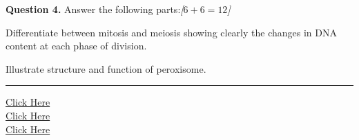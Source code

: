\documentclass[11pt,a4paper]{article}
\newcommand{\pts}[1]{\hfill   \textit{[#1]}}
\begin{document}
\medskip


\noindent   \textbf{Question 4.} Answer the following parts:\pts{$6 + 6 = 12$}

\begin{parts}
  \item Differentiate between mitosis and meiosis showing clearly the changes in DNA content at each phase of division.
  \item Illustrate structure and function of peroxisome.
\end{parts}

\vfill
\rule{\linewidth}{0.4pt}

\begin{center}\small
\href{https://bhu-exam.vercel.app/}{Click Here}\\[4pt]\href{https://me-aryan.vercel.app/}{Click Here}\\[4pt]\href{https://quashan-me.vercel.app/}{Click Here}
\end{center}
\end{document}
